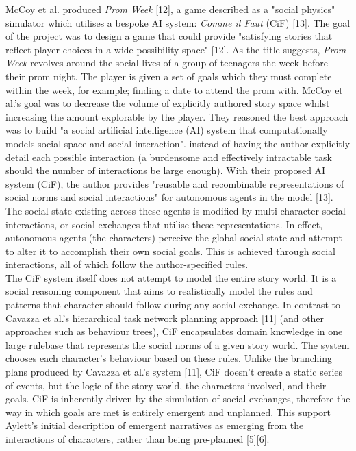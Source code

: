 \documentclass{sig-alternate-05-2015}
\begin{document}
\newline McCoy et al. produced \textit{Prom Week} [12], a game described as a "social physics" simulator which utilises a bespoke AI system: \textit{Comme il Faut} (CiF) [13]. The goal of the project was to design a game that could provide "satisfying stories that reflect player choices in a wide possibility space" [12].
As the title suggests, \textit{Prom Week} revolves around the social lives of a group of teenagers the week before their prom night. The player is given a set of goals which they must complete within the week, for example; finding a date to attend the prom with. McCoy et al.'s goal was to decrease the volume of explicitly authored story space whilst increasing the amount explorable by the player. They reasoned the best approach was to build "a social artificial intelligence (AI) system that computationally models social space and social interaction". instead of having the author explicitly detail each possible interaction (a burdensome and effectively intractable task should the number of interactions be large enough). With their proposed AI system (CiF),  the author provides "reusable and recombinable representations of social norms and social interactions" for autonomous agents in the model [13]. The social state existing across these agents is modified by multi-character social interactions, or social exchanges that utilise these representations. In effect, autonomous agents (the characters) perceive the global social state and attempt to alter it to accomplish their own social goals. This is achieved through social interactions, all of which follow the author-specified rules.\\

\newline The CiF system itself does not attempt to model the entire story world. It is a social reasoning component that aims to realistically model the rules and patterns that character should follow during any social exchange. In contrast to Cavazza et al.'s hierarchical task network planning approach [11] (and other approaches such as behaviour trees), CiF encapsulates domain knowledge in one large rulebase that represents the social norms of a given story world. The system chooses each character's behaviour based on these rules. Unlike the branching plans produced by Cavazza et al.'s system [11], CiF doesn't create a static series of events, but the logic of the story world, the characters involved, and their goals. CiF is inherently driven by the simulation of social exchanges, therefore the way in which goals are met is entirely emergent and unplanned. This support Aylett's initial description of emergent narratives as emerging from the interactions of characters, rather than being pre-planned [5][6].
\end{document}
